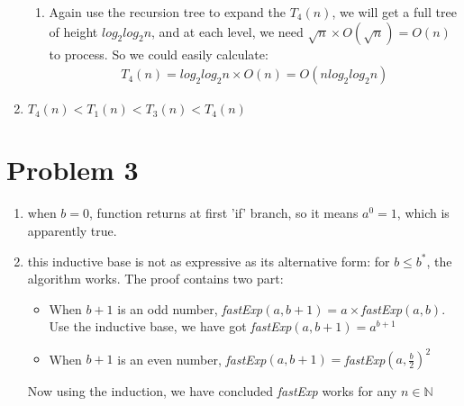 \documentclass[paper=a4, fontsize=11pt]{scrartcl} %
\numberwithin{equation}{section} %
\numberwithin{figure}{section} %
\numberwithin{table}{section} %
\begin{document}
\begin{enumerate}[label={2.(\alph*)}]
\begin{enumerate}[label={\roman*.}]
      \item Again use the recursion tree to expand the $T_4(n)$, we will get a
	full tree of height $log_2log_2n$, and at each level, we need $\sqrt{n}
	\times O(\sqrt{n}) = O(n)$ to process. So we could easily calculate:
	\begin{align*}
	  T_4(n) = log_2log_2n \times O(n) = O(n log_2log_2n)
	\end{align*}

    \end{enumerate}

  \item $T_4(n) < T_1(n) < T_3(n) < T_4(n)$

\end{enumerate}


\section*{Problem 3}
\begin{enumerate}[label={3.\arabic*}]
  \item when $b=0$, function returns at first 'if' branch, so it means $a^0=1$, which is apparently true.

  \item this inductive base is not as expressive as its alternative form: for $b \leq b^*$, the algorithm works. The proof contains two part:
    \begin{itemize}
      \item When $b+1$ is an odd number, \textit{fastExp}$(a,b+1)=a\times$\textit{fastExp}$(a,b)$. Use the inductive base, we have got \textit{fastExp}$(a,b+1) = a^{b+1}$
      \item When $b+1$ is an even number, \textit{fastExp}$(a,b+1)=$\textit{fastExp}$(a, \frac{b}{2})^2$ 
    \end{itemize}
    Now using the induction, we have concluded \textit{fastExp} works for any $n \in \mathbb{N}$

\end{enumerate}

\end{document}
